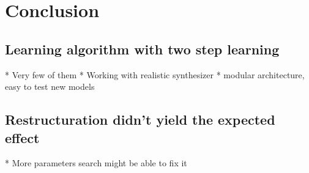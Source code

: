 \documentclass{report}
\begin{document}
\chapter{Conclusion}\label{conclusion}

\section{Learning algorithm with two step
learning}\label{learning-algorithm-with-two-step-learning}

  * Very few of them
  * Working with realistic synthesizer
  * modular architecture, easy to test new models
\section{Restructuration didn't yield the expected
effect}\label{restructuration-didnt-yield-the-expected-effect}

 * More parameters search might be able to fix it

\printbibliography{}
\end{document}
